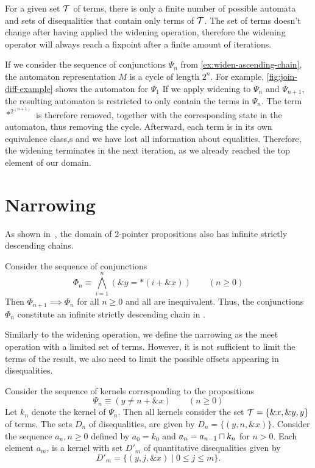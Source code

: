 For a given set $\mathcal{T}$ of terms, there is only a finite number of possible automata and sets of disequalities that contain only terms of $\mathcal{T}$.
The set of terms doesn't change after having applied the widening operation, therefore the widening operator will always reach a fixpoint after a finite amount of iterations.

\begin{example}\label{ex:widen}
  If we consider the sequence of conjunctions $\Psi_n$ from \cref{ex:widen-ascending-chain}, the automaton representation $M$ is a cycle of length $2^n$.
  For example, \cref{fig:join-diff-example} shows the automaton for $\Psi_1$
  If we apply widening to $\Psi_n$ and $\Psi_{n+1}$, the resulting automaton is restricted to only contain the terms in $\Psi_n$.
  The term $*^{2^(n+1)}$ is therefore removed, together with the corresponding state in the automaton, thus removing the cycle.
  Afterward, each term is in its own equivalence class,s and we have lost all information about equalities.
  Therefore, the widening terminates in the next iteration,
  as we already reached the top element of our domain.
\end{example}

\section{Narrowing}

As shown in~\cite{2pointer}, the domain of 2-pointer propositions also has infinite strictly descending chains.

\begin{example}
	Consider the sequence of conjunctions
	\[
	\Phi_n \equiv\bigwedge_{i=1}^n (\&y = *(i+\&x))\qquad(n\geq 0)
	\]
	Then $\Phi_{n+1}\implies\Phi_n$ for all $n\geq 0$ and all are inequivalent.
	Thus, the conjunctions $\Phi_n$ constitute an infinite strictly descending chain in \cpo.
\end{example}

Similarly to the widening operation, we define the narrowing as the meet operation with a limited set of terms.
However, it is not sufficient to limit the terms of the result, we also need to limit the possible offsets
appearing in disequalities.\cite{new-paper-todo}

\begin{example}\label{e:narrow1}
	Consider the sequence of kernels corresponding to the propositions
	\[
	\Psi_n \equiv (y\neq n+\&x)\qquad(n\geq 0)
	\]
	Let $k_n$ denote the kernel of $\Psi_n$.
  Then all kernels consider the set $\mathcal{T}=\{\&x,\&y,y\}$ of terms.
	The sets $D_n$ of disequalities, are given by $D_n=\{(y,n,\&x)\}$.
  Consider the sequence $a_n, n\geq 0$ defined by $a_0 = k_0$ and $a_n = a_{n-1}\sqcap k_n$ for $n>0$.
  Each element $a_m$, is a kernel with set $D'_m$ of quantitative disequalities given by
	\[
	D'_m = \{(y,j,\&x)\mid 0\leq j\leq m\}.
	\]
\end{example}

